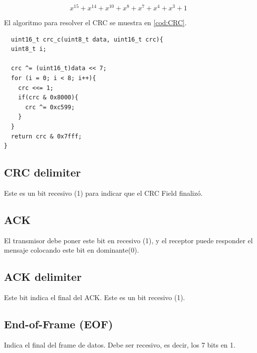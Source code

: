 $$x^{15} + x^{14} + x^{10} + x^{8} + x^7 + x^4 + x^3 + 1$$

El algoritmo para resolver el CRC se muestra en \ref{cod:CRC}.

\begin{lstlisting}
  uint16_t crc_c(uint8_t data, uint16_t crc){
  uint8_t i;

  crc ^= (uint16_t)data << 7;
  for (i = 0; i < 8; i++){
    crc <<= 1;
    if(crc & 0x8000){
      crc ^= 0xc599;
    }
  }
  return crc & 0x7fff;
}
\end{lstlisting}

\subsection{CRC delimiter}
Este es un bit recesivo (1) para indicar que el CRC Field finalizó.

\subsection{ACK}
El transmisor debe poner este bit en recesivo (1), y el receptor puede responder
el mensaje colocando este bit en dominante(0).

\subsection{ACK delimiter}
Este bit indica el final del ACK. Este es un bit recesivo (1).

\subsection{End-of-Frame (EOF)}
Indica el final del frame de datos. Debe ser recesivo, es decir, los 7 bits en
1.
